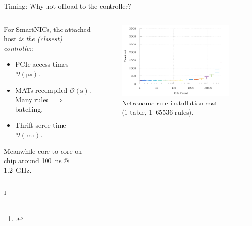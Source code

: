\documentclass[aspectratio=169,xcolor={dvipsnames}
,handout
]{beamer}
\begin{document}
\begin{frame}{Timing: Why not offload to the controller?}
	\begin{columns}
		\begin{column}{0.5\linewidth}
			For SmartNICs, the attached host \emph{is the (closest) controller}.
			
			\begin{itemize}
				\item PCIe access times $\mathcal{O}(\si{\micro\second})$.\footnotemark
				\item MATs recompiled $\mathcal{O}(\si{\second})$. Many rules $\implies$ batching.
				\item Thrift serde time $\mathcal{O}(\si{\milli\second})$.
			\end{itemize}
			
			
			\alert{Meanwhile core-to-core on chip around \SI{100}{\nano\second} @ \SI{1.2}{\giga\hertz}.}
		\end{column}
		\begin{column}{0.5\linewidth}
			\begin{figure}
				\includegraphics[width=0.9\linewidth]{../plots/build/rte-timer/rte-times-logx}
				\caption{Netronome rule installation cost \\(1 table, \numrange{1}{65536} rules).}
			\end{figure}
		\end{column}
	\end{columns}
	
	\footcitetext{DBLP:conf/sigcomm/NeugebauerAZAL018}
\end{frame}
\end{document}

